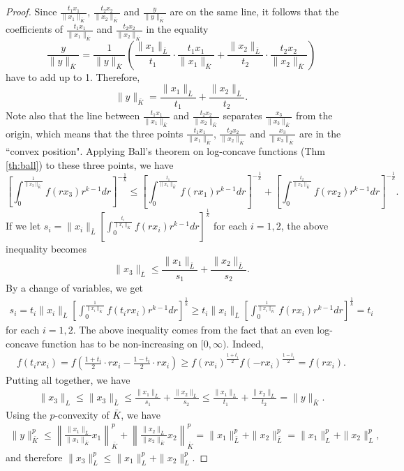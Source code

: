 \documentclass[12pt]{amsart} %
\renewcommand{\[}{\left[}
\renewcommand{\(}{\left(}
\renewcommand{\]}{\right]}
\renewcommand{\)}{\right)}
\renewcommand{\le}{\leqslant}
\renewcommand{\ge}{\geqslant}
\begin{document}
\begin{proof}
Since $\frac{t_1x_1}{\|x_1\|_{\bar K}}$, $\frac{t_2x_2}{\|x_2\|_{\bar K}}$ and $\frac{y}{\|y\|_{\bar K}}$ are on the same line, it follows that the
coefficients of $\frac{t_1x_1}{\|x_1\|_{\bar K}}$ and $\frac{t_2x_2}{\|x_2\|_{\bar K}}$ in the equality
$$
\frac{y}{\|y\|_{\bar K}} = \frac{1}{\|y\|_{\bar K}} \( \frac{\|x_1\|_{\bar L}}{t_1}\cdot\frac{t_1x_1}{\|x_1\|_{\bar K}} + \frac{\|x_2\|_{\bar L}}{t_2}\cdot\frac{t_2x_2}{\|x_2\|_{\bar K}} \)
$$
have to add up to 1. Therefore,
$$
\|y\|_{\bar K} = \frac{\|x_1\|_{\bar L}}{t_1} + \frac{\|x_2\|_{\bar L}}{t_2}.
$$
Note also that the line between $\frac{t_1x_1}{\|x_1\|_{\bar K}}$ and $\frac{t_2x_2}{\|x_2\|_{\bar K}}$ separates $\frac{x_3}{\|x_3\|_{\bar K}}$ from the origin, which means that the three points $\frac{t_1x_1}{\|x_1\|_{\bar K}}$, $\frac{t_2x_2}{\|x_2\|_{\bar K}}$ and $\frac{x_3}{\|x_3\|_{\bar K}}$ are in the ``convex position". Applying Ball's theorem on log-concave functions (Thm \ref{th:ball}) to these three points, we have
$$
\[\int_0^{\frac{1}{\|x_3\|_{\bar K}}} f(rx_3)r^{k-1}dr \]^{-\frac 1k}
\le \[\int_0^{\frac{t_1}{\|x_1\|_{\bar K}}} f(rx_1)r^{k-1}dr \]^{-\frac 1k}
+ \[\int_0^{\frac{t_2}{\|x_2\|_{\bar K}}} f(rx_2)r^{k-1}dr \]^{-\frac 1k}.
$$
If we let $s_i = \|x_i\|_{\bar L} \[\int_0^{\frac{t_i}{\|x_i\|_{\bar K}}} f(rx_i)r^{k-1}dr \]^{\frac 1k}$ for each $i=1,2$, the above inequality becomes $$\|x_3\|_{\bar L} \le \frac{\|x_1\|_{\bar L}}{s_1} + \frac{\|x_2\|_{\bar L}}{s_2}.$$ By a change of variables, we get
\begin{eqnarray*}
s_i = t_i \|x_i\|_{\bar L} \[\int_0^{\frac{1}{\|x_i\|_{\bar K}}} f(t_i rx_i)r^{k-1}dr \]^{\frac 1k}
\ge t_i \|x_i\|_{\bar L} \[\int_0^{\frac{1}{\|x_i\|_{\bar K}}} f(rx_i)r^{k-1}dr \]^{\frac 1k}
= t_i
\end{eqnarray*}
for each $i=1,2$. The above inequality comes from the fact that an even log-concave function has to be non-increasing on $[0,\infty)$. Indeed,
\begin{eqnarray*}
f(t_i rx_i) = f\(\frac{1+t_i}{2}\cdot rx_i - \frac{1-t_i}{2}\cdot rx_i\)
\ge f(rx_i)^{\frac{1+t_i}{2}}f(-rx_i)^{\frac{1-t_i}{2}} = f(rx_i).
\end{eqnarray*}
Putting all together, we have
\begin{eqnarray*}
  \|x_3\|_L \le \|x_3\|_{\bar L}\le \frac{\|x_1\|_{\bar L}}{s_1} + \frac{\|x_2\|_{\bar L}}{s_2}
\le \frac{\|x_1\|_{\bar L}}{t_1} + \frac{\|x_2\|_{\bar L}}{t_2} = \|y\|_{\bar K}.
\end{eqnarray*}
Using the  $p$-convexity of $\bar{K}$, we have
\begin{eqnarray*}
\|y\|_{\bar K}^p \le  \left\|\frac{\|x_1\|_{\bar L}}{\|x_1\|_{\bar K}}x_1\right\|_{\bar K}^p + \left\|\frac{\|x_2\|_{\bar L}}{\|x_2\|_{\bar K}}x_2\right\|_{\bar K}^p
=\|x_1\|_{\bar L}^p + \|x_2\|_{\bar L}^p = \|x_1\|_L^p + \|x_2\|_L^p,
\end{eqnarray*}
and therefore $\|x_3\|_L^p \le \|x_1\|_L^p + \|x_2\|_L^p$.

\end{proof}
\end{document}
